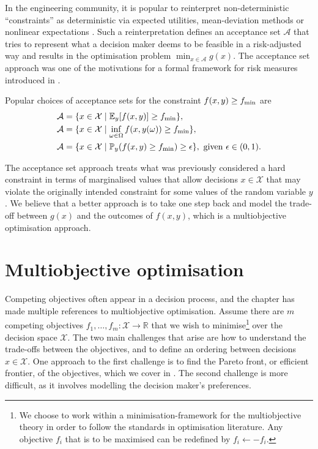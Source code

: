 \documentclass[main.tex]{subfiles}
\begin{document}
In the engineering community, it is popular to
reinterpret non-deterministic ``constraints'' as deterministic via
expected utilities, mean-deviation methods or nonlinear
expectations
\citep{rockafellar2007coherent,rockafellar2015engineering}.
Such a reinterpretation defines an acceptance set $\mathcal{A}$ that
tries to represent what a decision maker deems to be feasible in a
risk-adjusted way and results in the optimisation problem
$\min_{x\in\mathcal{A}} g(x)$.
The acceptance set approach was one of the motivations for a formal
framework for risk measures introduced in \citep{artzner1999coherent}.
\begin{example}
  Popular choices of acceptance sets for the constraint $f(x,y)\geq
  f_{\textnormal{min}}$ are
  \begin{align}
    \mathcal{A}&=\{x\in\mathcal{X} \mid
                 \mathbb{E}_y[f(x,y)]\geq f_{\textnormal{min}}\}, \\
    \mathcal{A}&=\{x\in\mathcal{X} \mid
                 \inf_{\omega\in\Omega}f(x,y(\omega))\geq f_{\textnormal{min}}\},\\
    \mathcal{A} &= \{x\in\mathcal{X}\mid
                  \mathbb{P}_y(f(x,y)\geq f_{\textnormal{min}})\geq \epsilon\},
                  \text{ given }\epsilon\in(0,1).
  \end{align}
\end{example}

The acceptance set approach treats what was previously considered a
hard constraint in terms of marginalised values that allow decisions $x\in\mathcal{X}$
that may violate the originally intended constraint for some values of the random
variable $y$. We believe that a better approach is to take one step back
and model the trade-off between $g(x)$ and the outcomes of $f(x,y)$,
which is a multiobjective optimisation approach.

\section{Multiobjective optimisation}\label{sec:one_multiobjective}

Competing objectives often appear in a decision process, and the chapter
has made multiple references to multiobjective optimisation.  Assume
there are $m$ competing objectives
$f_1,\dots,f_m:\mathcal{X}\to\mathbb{R}$ that we wish to
minimise\footnote{We choose to work within a minimisation-framework
  for the multiobjective theory in order to follow the standards in
  optimisation literature. Any objective $f_i$ that is to be maximised
  can be redefined by $f_i\leftarrow -f_i$.  } over the decision space
$\mathcal{X}$. The two main challenges that arise are how to understand
the trade-offs between the objectives, and to define an ordering
between decisions $x\in\mathcal{X}$.  One approach to the first
challenge is to find the Pareto front, or efficient
frontier, of the objectives, which we cover in
. The second challenge is more difficult,
as it involves modelling the decision maker's preferences.
\end{document}
